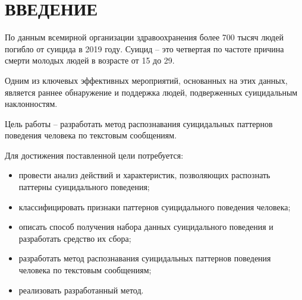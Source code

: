 \section*{ВВЕДЕНИЕ}

По данным всемирной организации здравоохранения более 700 тысяч людей погибло от суицида в 2019 году. Суицид -- это четвертая по частоте причина смерти молодых людей в возрасте от 15 до 29. \cite{suicideVOZ}

Одним из ключевых эффективных мероприятий, основанных на этих данных, является раннее обнаружение и поддержка людей, подверженных суицидальным наклонностям.

Цель работы -- разработать метод распознавания суицидальных паттернов поведения человека по текстовым сообщениям.

Для достижения поставленной цели потребуется:
\begin{itemize}
	\item провести анализ действий и характеристик, позволяющих распознать паттерны суицидального поведения;
	\item классифицировать признаки паттернов суицидального поведения человека;
	\item описать способ получения набора данных суицидального поведения и разработать средство их сбора;
	\item разработать метод распознавания суицидальных паттернов поведения человека по текстовым сообщениям;
	\item реализовать разработанный метод.
\end{itemize}

\pagebreak